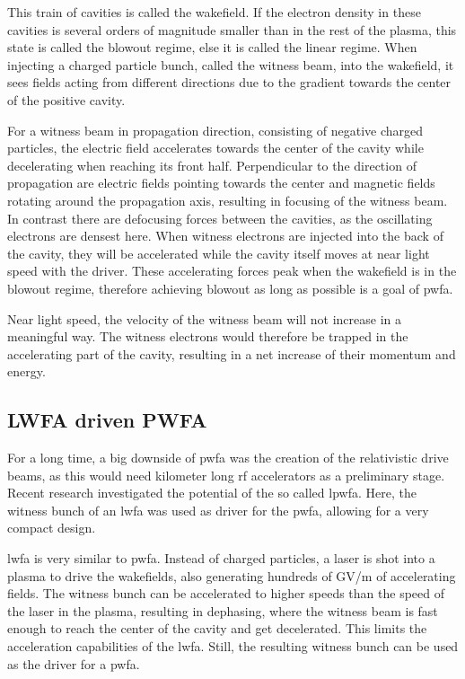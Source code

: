 \documentclass[bachelor_thesis]{subfiles}
\begin{document}
This train of cavities is called the wakefield. If the electron density in these cavities is several orders of magnitude smaller than in the rest of the plasma, this state is called the blowout regime, else it is called the linear regime.
When injecting a charged particle bunch, called the witness beam, into the wakefield, it sees fields acting from different directions due to the gradient towards the center of the positive cavity. 

For a witness beam in propagation direction, consisting of negative charged particles, the electric field accelerates towards the center of the cavity while decelerating when reaching its front half. 
Perpendicular to the direction of propagation are electric fields pointing towards the center and magnetic fields rotating around the propagation axis, resulting in focusing of the witness beam. In contrast there are defocusing forces between the cavities, as the oscillating electrons are densest here.
When witness electrons are injected into the back of the cavity, they will be accelerated while the cavity itself moves at near light speed with the driver.
These accelerating forces peak when the wakefield is in the blowout regime, therefore achieving blowout as long as possible is a goal of \gls{pwfa}.

Near light speed, the velocity of the witness beam will not increase in a meaningful way. The witness electrons would therefore be trapped in the accelerating part of the cavity, resulting in a net increase of their momentum and energy.

\subsection{LWFA driven PWFA} \label{chap:lpfwa}
For a long time, a big downside of \gls{pwfa} was the creation of the relativistic drive beams, as this would need kilometer long \gls{rf} accelerators as a preliminary stage. Recent research \cite{Kurz2021} investigated the potential of the so called \gls{lpwfa}.
Here, the witness bunch of an \gls{lwfa} was used as driver for the \gls{pwfa}, allowing for a very compact design.

\Gls{lwfa} is very similar to \gls{pwfa}. Instead of charged particles, a laser is shot into a plasma to drive the wakefields, also generating hundreds of \unit{\giga\volt/\m} of accelerating fields.
The witness bunch can be accelerated to higher speeds than the speed of the laser in the plasma, resulting in dephasing, where the witness beam is fast enough to reach the center of the cavity and get decelerated. 
This limits the acceleration capabilities of the \gls{lwfa}. Still, the resulting witness bunch can be used as the driver for a \gls{pwfa}.
\end{document}
